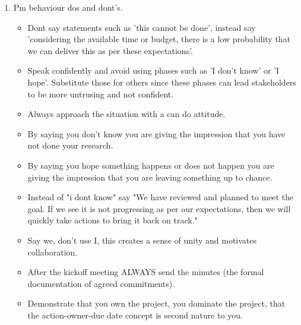 \begin{itemize}
\begin{enumerate}
            \item Pm behaviour dos and dont's.
                \begin{itemize}
                    \item Dont say statements such as 'this cannot be done', instead say 'considering the available time or budget, there is a low probability that we can deliver this as per these expectations'.
                    \item Speak confidently and avoid using phases such as 'I don't know' or 'I hope'. Substitute those for others since these phases can lead stakeholders to be more untrusing and not confident.
                    \item Always approach the situation with a can do attitude.
                    \item By saying you don't know you are giving the impression that you have not done your research.
                    \item By saying you hope something happens or does not happen you are giving the impression that you are leaving something up to chance.
                    \item Instead of "i dont know" say "We have reviewed and planned to meet the goal. If we see it is not progressing as per our expectations, then we will quickly take actions to bring it back on track."
                    \item Say we, don't use I, this creates a sense of unity and motivates collaboration.
                    \item After the kickoff meeting ALWAYS send the minutes (the formal documentation of agreed commitments).
                    \item Demonstrate that you own the project, you dominate the project, that the action-owner-due date concept is second nature to you.
                \end{itemize}
        \end{enumerate}
\end{itemize}

